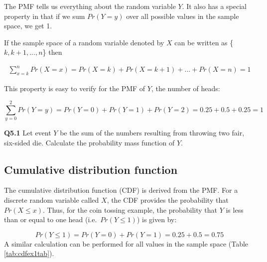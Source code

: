 \documentclass[
  oneside]{krantz}
\begin{document}
The PMF tells us everything about the random variable \(Y\). It also has a special property in that if we sum \(Pr(Y=y)\) over all possible values in the sample space, we get 1.

If the sample space of a random variable denoted by \(X\) can be written as \{\({k, k+1, ... , n}\)\} then

\begin{align}
\sum_{x=k}^{n} Pr(X=x) = Pr(X=k) + Pr(X=k+1) + ... + Pr(X=n) = 1
\end{align}

This property is easy to verify for the PMF of \(Y\), the number of heads:

\[\sum_{y=0}^{2} Pr(Y=y) = Pr(Y=0) + Pr(Y=1) + Pr(Y=2) = 0.25 + 0.5 + 0.25 = 1\]

\textbf{Q5.1} Let event \(Y\) be the sum of the numbers resulting from throwing two fair, six-sided die. Calculate the probability mass function of \(Y\).

\hypertarget{cumulative-distribution-function}{%
\subsection{Cumulative distribution function}\label{cumulative-distribution-function}}

The cumulative distribution function (CDF) is derived from the PMF. For a discrete random variable called \(X\), the CDF provides the probability that \(Pr(X \le x)\). Thus, for the coin tossing example, the probability that \(Y\) is less than or equal to one head (i.e.~\(Pr(Y \le 1)\)) is given by:

\[Pr(Y \le 1) = Pr(Y=0) + Pr(Y=1) = 0.25 + 0.5 = 0.75\]
A similar calculation can be performed for all values in the sample space (Table \ref{tab:cdfex1tab}).
\end{document}
